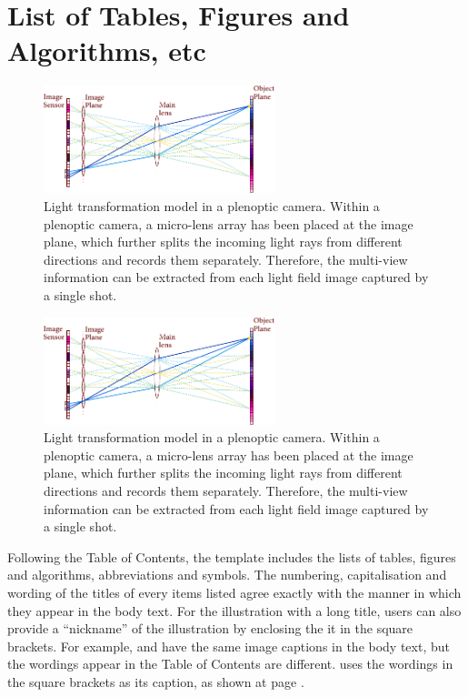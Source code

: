 \section{List of Tables, Figures and Algorithms, etc}
\label{chap2:sec7:list_of_tables_figures_and_algorithms_etc}
\begin{figure}[t]
    \centering
    \includegraphics[width=0.6\textwidth]{Figures/Chapter2/photo_consistency.pdf}
    \caption{Light transformation model in a plenoptic camera. Within a plenoptic camera, a micro-lens array has been placed at the image plane, which further splits the incoming light rays from different directions and records them separately. Therefore, the multi-view information can be extracted from each light field image captured by a single shot.}
    \label{fig:photo_consistency}
\end{figure}

\begin{figure}[t]
    \centering
    \includegraphics[width=0.6\textwidth]{Figures/Chapter2/photo_consistency.pdf}
    \caption[Light transformation model (focused on the plane).]{Light transformation model in a plenoptic camera. Within a plenoptic camera, a micro-lens array has been placed at the image plane, which further splits the incoming light rays from different directions and records them separately. Therefore, the multi-view information can be extracted from each light field image captured by a single shot.}
    \label{fig:photo_consistency_with_nickname}
\end{figure}
Following the Table of Contents, the template includes the lists of tables, figures and algorithms, abbreviations and symbols. The numbering, capitalisation and wording of the titles of every items listed agree exactly with the manner in which they appear in the body text. For the illustration with a long title, users can also provide a ``nickname'' of the illustration by enclosing the it in the square brackets. For example,  and  have the same image captions in the body text, but the wordings appear in the Table of Contents are different.  uses the wordings in the square brackets as its caption, as shown at page .
